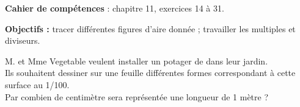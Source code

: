 \vfill

\textcolor{PartieGeometrie}{\sffamily\bfseries Cahier de compétences} : chapitre 11, exercices 14 à 31.


\activites

\begin{activite}
   {\bf Objectifs :} tracer différentes figures d'aire donnée ; travailler les multiples et diviseurs.
   \begin{QCM}
      M. et Mme Vegetable veulent installer un potager de  dans leur jardin. \\
         Ils souhaitent dessiner sur une feuille différentes formes correspondant à cette surface au 1/100. \\
         Par combien de centimètre sera représentée une longueur de 1 mètre ? \pf \\
   

\end{QCM}
\end{activite}
